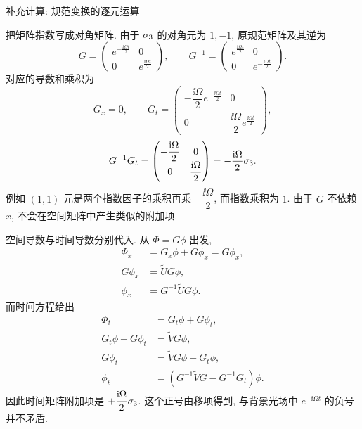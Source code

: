 \par\medskip\noindent 补充计算: 规范变换的逐元运算\par
\par\smallskip\noindent 把矩阵指数写成对角矩阵.\quad
由于 $\sigma_3$ 的对角元为 $1,-1$, 原规范矩阵及其逆为
\begin{equation*}
G=
\begin{pmatrix}
e^{-\frac{\ii\Omega t}{2}}&0\\
0&e^{\frac{\ii\Omega t}{2}}
\end{pmatrix},
\qquad
G^{-1}=
\begin{pmatrix}
e^{\frac{\ii\Omega t}{2}}&0\\
0&e^{-\frac{\ii\Omega t}{2}}
\end{pmatrix}.
\end{equation*}
对应的导数和乘积为
\begin{equation*}
G_x=0,
\qquad
G_t=
\begin{pmatrix}
-\dfrac{\ii\Omega}{2}e^{-\frac{\ii\Omega t}{2}}&0\\
0&\dfrac{\ii\Omega}{2}e^{\frac{\ii\Omega t}{2}}
\end{pmatrix},
\end{equation*}
\begin{equation*}
G^{-1}G_t=
\begin{pmatrix}
-\dfrac{\mathrm{i}\Omega}{2}&0\\
0&\dfrac{\mathrm{i}\Omega}{2}
\end{pmatrix}
=-\dfrac{\mathrm{i}\Omega}{2}\sigma_3.
\end{equation*}
例如 $(1,1)$ 元是两个指数因子的乘积再乘 $-\dfrac{\ii\Omega}{2}$, 而指数乘积为 $1$. 由于 $G$ 不依赖 $x$, 不会在空间矩阵中产生类似的附加项.
\par\smallskip\noindent 空间导数与时间导数分别代入.\quad
从 $\Phi=G\phi$ 出发,
\begin{align*}
\Phi_x&=G_x\phi+G\phi_x=G\phi_x,\\
G\phi_x&=\widetilde U G\phi,\\
\phi_x&=G^{-1}\widetilde U G\phi.
\end{align*}
而时间方程给出
\begin{align*}
\Phi_t&=G_t\phi+G\phi_t,\\
G_t\phi+G\phi_t&=\widetilde V G\phi,\\
G\phi_t&=\widetilde V G\phi-G_t\phi,\\
\phi_t&=(G^{-1}\widetilde V G-G^{-1}G_t)\phi.
\end{align*}
因此时间矩阵附加项是 $+\dfrac{\mathrm{i}\Omega}{2}\sigma_3$. 这个正号由移项得到, 与背景光场中 $e^{-\ii\Omega t}$ 的负号并不矛盾.
